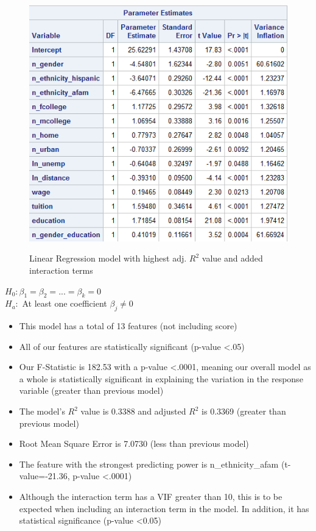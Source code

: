 \documentclass[12pt]{article}
\begin{document}
\begin{figure}[h]
\begin{minipage}[t]{0.55\textwidth}
        \includegraphics[width=\textwidth]{images/model2_b.png}
        
        \label{fig:unemp_measures}
    \end{minipage}
    \caption{Linear Regression model with highest adj. $R^{2}$ value and added interaction terms}
    \label{fig:unemp_fig}
\end{figure}

 \large\noindent $H_{0}: \beta_1 = \beta_2 = ... = \beta_k = 0$\\
 $H_a:$ At least one coefficient $\beta_j \ne 0$ 
  \normalsize
\begin{itemize}
    \item This model has a total of 13 features (not including score)
    \item All of our features are statistically significant (p-value \textless .05)
    \item Our F-Statistic is 182.53 with a p-value \textless .0001, meaning our overall model as a whole is statistically significant in explaining the variation in the response variable (greater than previous model)
    \item The model's $R^2$ value is 0.3388 and adjusted $R^2$ is 0.3369 (greater than previous model)
    \item Root Mean Square Error is 7.0730 (less than previous model)
    \item The feature with the strongest predicting power is n\_ethnicity\_afam (t-value=-21.36, p-value \textless .0001)
    \item Although the interaction term has a VIF greater than 10, this is to be expected when including an interaction term in the model. In addition, it has statistical significance (p-value \textless 0.05)
\end{itemize}
\end{document}
